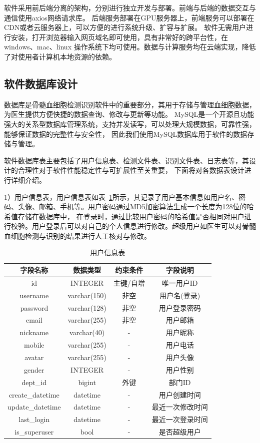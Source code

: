 软件采用前后端分离的架构，分别进行独立开发与部署。前端与后端的数据交互与通信使用axios网络请求库。
后端服务部署在GPU服务器上，前端服务可以部署在CDN或者云服务器上，可以方便的进行系统升级、扩容与扩展。
软件无需用户进行安装，打开浏览器输入网页域名即可使用，具有非常好的跨平台性，在windows、mac、linux
操作系统下均可使用。数据与计算服务均在云端实现，降低了对使用者计算机本地资源的依赖。

\subsection{软件数据库设计}
数据库是骨髓血细胞检测识别软件中的重要部分，其用于存储与管理血细胞数据，为医生提供方便快捷的数据查询、修改与更新等功能。
MySQL是一个开源且功能强大的关系型数据库管理系统，支持并发读写，可以处理大规模数据，可靠性强，能够保证数据的完整性与安全性，
因此我们使用MySQL数据库\cite{christudas2019mysql}用于软件的数据存储与管理。

软件数据库表主要包括了用户信息表、检测文件表、识别文件表、日志表等，其设计的合理性对于软件性能稳定性与可扩展性至关重要，
下面将对各数据表设计进行详细介绍。

1）用户信息表，用户信息表如表~\ref{table:user_table}所示，其记录了用户基本信息如用户名、密码、头像、邮箱、手机等。用户密码通过MD5加密算法生成一个长度为128位的哈希值存储在数据库中，
在登录时，通过比较用户密码的哈希值是否相同对用户进行校验。用户登录后可以对自己的个人信息进行修改。超级用户如医生可以对骨髓血细胞检测与识别的结果进行人工核对与修改。
\begin{table}[htb]
    \caption{用户信息表}   
    \centering 
    \label{table:user_table}
    \begin{tabular*}{0.9\hsize}{@{}@{\extracolsep{\fill}}cccc@{}}
      \toprule[1pt]
      字段名称  &  数据类型 & 约束条件 & 字段说明 \\
      \midrule[1pt] 
      id & INTEGER & 主键/自增 & 唯一用户ID   \\ 
      username & varchar(150) & 非空 & 用户名(登录)   \\ 
      password & varchar(128) & 非空 & 用户登录密码   \\ 
      email    & varchar(255) & 非空 & 用户邮箱 \\
      nickname & varchar(40)  &  -   & 用户昵称  \\ 
      mobile   & varchar(255) &  -   & 用户电话  \\
      avatar   & varchar(255) &  -   & 用户头像  \\
      gender   & INTEGER      &  -   & 用户性别   \\
      dept\_id  & bigint       &  外键   &  部门ID  \\ 
      create\_datetime & datetime & -    & 用户创建时间 \\
      update\_datetime & datetime & -    & 最近一次修改时间 \\
      last\_login & datetime & -           & 最近一次登录时间 \\
      is\_superuser & bool   &  -         & 是否超级用户 \\
      \bottomrule[1pt]      
    \end{tabular*} 
  \end{table}

